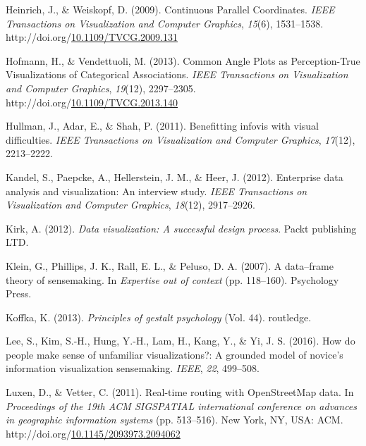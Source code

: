 \documentclass[print]{nuthesis}
\newlength{\cslhangindent}
\newenvironment{CSLReferences}[2]%
{\setlength{\parindent}{0pt}%
\everypar{\setlength{\hangindent}{\cslhangindent}}\ignorespaces}%
{\par}
\begin{document}
\begin{CSLReferences}{1}{0}
\leavevmode{}%
Heinrich, J., \& Weiskopf, D. (2009). {Continuous Parallel Coordinates}. \emph{IEEE Transactions on Visualization and Computer Graphics}, \emph{15}(6), 1531--1538. http://doi.org/\href{https://doi.org/10.1109/TVCG.2009.131}{10.1109/TVCG.2009.131}

\leavevmode{}%
Hofmann, H., \& Vendettuoli, M. (2013). {Common Angle Plots as Perception-True Visualizations of Categorical Associations}. \emph{IEEE Transactions on Visualization and Computer Graphics}, \emph{19}(12), 2297--2305. http://doi.org/\href{https://doi.org/10.1109/TVCG.2013.140}{10.1109/TVCG.2013.140}

\leavevmode{}%
Hullman, J., Adar, E., \& Shah, P. (2011). Benefitting infovis with visual difficulties. \emph{IEEE Transactions on Visualization and Computer Graphics}, \emph{17}(12), 2213--2222.

\leavevmode{}%
Kandel, S., Paepcke, A., Hellerstein, J. M., \& Heer, J. (2012). Enterprise data analysis and visualization: An interview study. \emph{IEEE Transactions on Visualization and Computer Graphics}, \emph{18}(12), 2917--2926.

\leavevmode{}%
Kirk, A. (2012). \emph{Data visualization: A successful design process}. Packt publishing LTD.

\leavevmode{}%
Klein, G., Phillips, J. K., Rall, E. L., \& Peluso, D. A. (2007). A data--frame theory of sensemaking. In \emph{Expertise out of context} (pp. 118--160). Psychology Press.

\leavevmode{}%
Koffka, K. (2013). \emph{Principles of gestalt psychology} (Vol. 44). routledge.

\leavevmode{}%
Lee, S., Kim, S.-H., Hung, Y.-H., Lam, H., Kang, Y., \& Yi, J. S. (2016). How do people make sense of unfamiliar visualizations?: A grounded model of novice's information visualization sensemaking. \emph{IEEE}, \emph{22}, 499--508.

\leavevmode{}%
Luxen, D., \& Vetter, C. (2011). Real-time routing with OpenStreetMap data. In \emph{Proceedings of the 19th ACM SIGSPATIAL international conference on advances in geographic information systems} (pp. 513--516). New York, NY, USA: ACM. http://doi.org/\href{https://doi.org/10.1145/2093973.2094062}{10.1145/2093973.2094062}


\end{CSLReferences}
\end{document}
